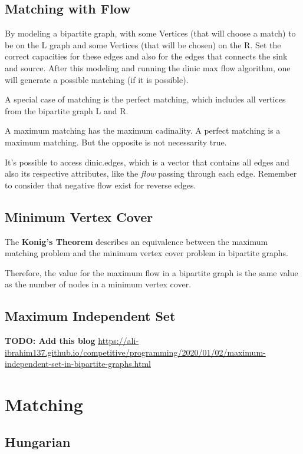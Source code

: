 	\subsection{Matching with Flow}

	By modeling a bipartite graph, with some Vertices (that will choose a match) to be on the L graph and some Vertices (that will be chosen) on the R.
	Set the correct capacities for these edges and also for the edges that connects the sink and source. After this modeling
	and running the dinic max flow algorithm, one will generate a possible matching (if it is possible).

	A special case of matching is the perfect matching, which includes all vertices from the bipartite graph L and R.

	A maximum matching has the maximum cadinality. A perfect matching is a maximum matching. 
	But the opposite is not necessarity true.

	It's possible to access dinic.edges, which is a vector that contains all edges and also its respective attributes, 
	like the \textit{flow} passing through each edge. Remember to consider that negative flow exist for reverse edges.

	\subsection{Minimum Vertex Cover}

	The \textbf{Konig's Theorem} describes an equivalence between the maximum matching
	problem and the minimum vertex cover problem in bipartite graphs.

	Therefore, the value for the maximum flow in a bipartite graph is the same value as the number of nodes in a minimum vertex cover.

	\subsection{Maximum Independent Set}

	\textbf{TODO: Add this blog}
	\url{https://ali-ibrahim137.github.io/competitive/programming/2020/01/02/maximum-independent-set-in-bipartite-graphs.html}

\section{Matching}

	\subsection{Hungarian}

